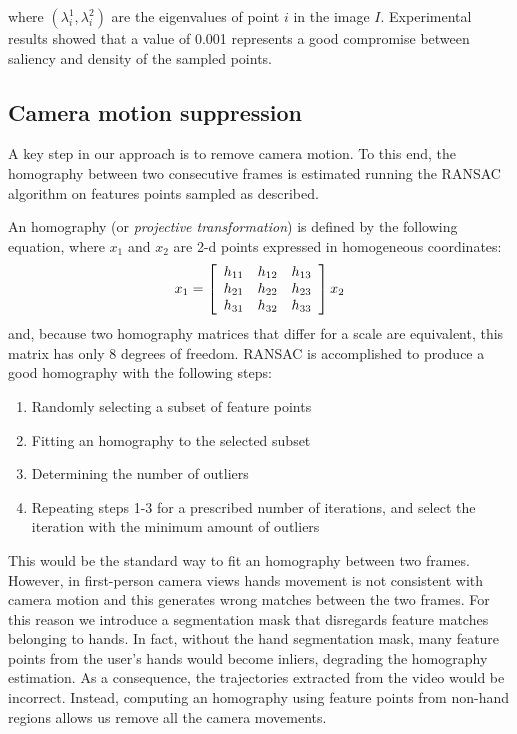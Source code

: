where $(\lambda_i^1, \lambda_i^2)$ are the eigenvalues of point $i$ in the image $I$. Experimental results showed that a value
of 0.001 represents a good compromise between saliency and density of the sampled points.

\subsection{Camera motion suppression}
A key step in our approach is to remove camera motion. To this end, the homography between two consecutive frames is estimated running the RANSAC algorithm on features points sampled as described. 

An homography (or \textit{projective transformation}) is defined by the following equation, where $x_1$ and $x_2$ are 2-d points expressed in homogeneous coordinates:
$$
x_1 = \left[\begin{array}{c c c}
 h_{11} & h_{12} & h_{13} \\
 h_{21} & h_{22} & h_{23} \\
 h_{31} & h_{32} & h_{33}
 \end{array}\right] x_2
$$
and, because two homography matrices that differ for a scale are equivalent, this matrix has only 8 degrees of freedom. RANSAC is accomplished to produce a good homography with the following steps:
\begin{enumerate}
\item Randomly selecting a subset of feature points
\item Fitting an homography to the selected subset
\item Determining the number of outliers
\item Repeating steps 1-3 for a prescribed number of iterations, and select the iteration with the minimum amount of outliers
\end{enumerate}

This would be the standard way to fit an homography between two frames. However, in first-person camera views hands movement is not consistent with camera motion and this generates wrong matches between the two frames. For this reason we introduce a segmentation mask that disregards feature matches belonging to hands. In fact, without the hand segmentation mask, many feature points from the user's hands would become inliers, degrading the homography estimation. As a consequence, the trajectories extracted from the video would be incorrect. Instead, computing an homography using feature points from non-hand regions allows us remove all the camera movements.

